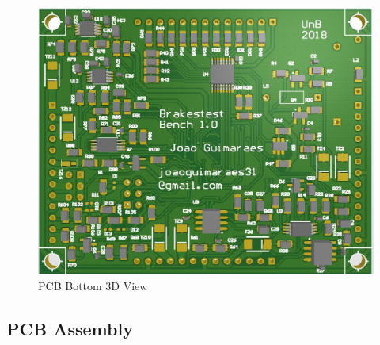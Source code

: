 		\begin{figure}[htbp]
			\centering
			\includegraphics[scale=0.7]{figuras/fig-pcb-print-bottom.png}
			\caption{PCB Bottom 3D View \cite{pcb-print-bottom}}
			\label{fig:pcb-print-bottom}
		\end{figure}

	\subsection{PCB Assembly}\label{ssec:pcb-assembly}
